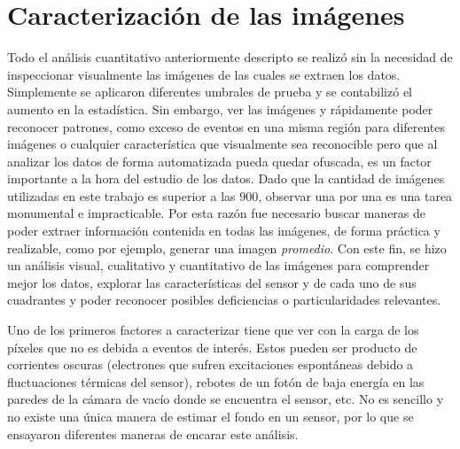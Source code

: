\section{Caracterización de las imágenes}
\noindent Todo el análisis cuantitativo anteriormente descripto se realizó sin la necesidad de inspeccionar visualmente las imágenes de las cuales se extraen los datos. Simplemente se aplicaron diferentes umbrales de prueba y se contabilizó el aumento en la estadística. Sin embargo, ver las imágenes y rápidamente poder reconocer patrones, como exceso de eventos en una misma región para diferentes imágenes o cualquier característica que visualmente sea reconocible pero que al analizar los datos de forma automatizada pueda quedar ofuscada, es un factor importante a la hora del estudio de los datos. Dado que la cantidad de imágenes utilizadas en este trabajo es superior a las $900$, observar una por una es una tarea monumental e impracticable. Por esta razón fue necesario buscar maneras de poder extraer información contenida en todas las imágenes, de forma práctica y realizable, como por ejemplo, generar una imagen \textit{promedio}. Con este fin, se hizo un análisis visual, cualitativo y cuantitativo de las imágenes para comprender mejor los datos, explorar las características del sensor y de cada uno de sus cuadrantes y poder reconocer posibles deficiencias o particularidades relevantes.

Uno de los primeros factores a caracterizar tiene que ver con la carga de los píxeles que no es debida a eventos de interés. Estos pueden ser producto de corrientes oscuras (electrones que sufren excitaciones espontáneas debido a fluctuaciones térmicas del sensor), rebotes de un fotón de baja energía en las paredes de la cámara de vacío donde se encuentra el sensor, etc. No es sencillo y no existe una única manera de estimar el fondo en un sensor, por lo que se ensayaron diferentes maneras de encarar este análisis.

